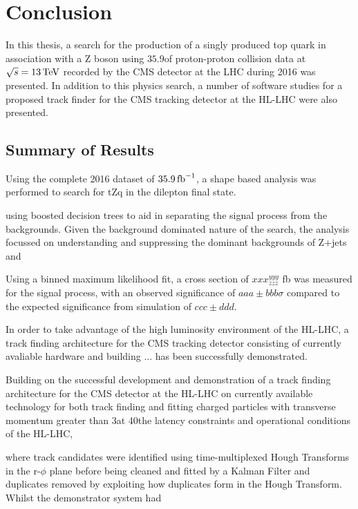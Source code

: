 \chapter{Conclusion}\label{chapter:conclusion}
In this thesis, a search for the production of a singly produced top quark in association with a Z boson using $35.9$\fbinv of proton-proton collision data at $\sqrt{s} = 13\,\text{Te\hspace{-.08em}V}$ recorded by the CMS detector at the LHC  during 2016 was presented.
In addition to this physics search, a number of software studies for a proposed track finder for the  CMS tracking detector at the HL-LHC were also presented.

\section{Summary of Results}
Using the complete 2016 dataset of $35.9\mbox{\ensuremath{\,\text{fb}^\text{$-$1}}}$, a shape based analysis was performed to search for tZq in the dilepton final state.

 using boosted decision trees to aid in separating the signal process from the backgrounds.
Given the background dominated nature of the search, the analysis focussed on understanding and suppressing the dominant backgrounds of Z+jets and \ttbar

Using a binned maximum likelihood fit, a cross section of $xxx^{yyy}_{zzz}$ fb was measured for the signal process, with an observed significance of $aaa \pm bbb \sigma$ compared to the expected significance from simulation of $ccc \pm ddd$. 



In order to take advantage of the high luminosity environment of the HL-LHC, a track finding architecture for the CMS tracking detector consisting of currently avaliable hardware and building ... has been successfully demonstrated.


Building on the successful development and demonstration of a track finding architecture for the CMS detector at the HL-LHC on currently available technology for both track finding and fitting charged particles with transverse momentum greater than 3\GeV at 40\MHz the latency constraints and operational conditions of the HL-LHC, 


where track candidates were identified using time-multiplexed Hough Transforms in the r-$\phi$ plane before being cleaned and fitted by a Kalman Filter and duplicates removed by exploiting how duplicates form in the Hough Transform. 
Whilst the demonstrator system had 

